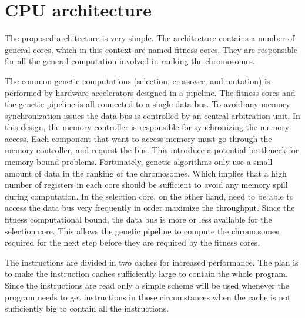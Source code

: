 \section {CPU architecture}




The proposed architecture is very simple.
The architecture contains a number of general cores, which in this context are named fitness cores.
They are responsible for all the general computation involved in ranking the chromosomes.

The common genetic computations (selection, crossover, and mutation) is performed by hardware accelerators designed in a pipeline.
The fitness cores and the genetic pipeline is all connected to a single data bus.
To avoid any memory synchronization issues the data bus is controlled by an central arbitration unit.
In this design, the memory controller is responsible for synchronizing the memory access.
Each component that want to access memory must go through the memory controller, and request the bus.
This introduce a potential bottleneck for memory bound problems.
Fortunately, genetic algorithms only use a small amount of data in the ranking of the chromosomes.
Which implies that a high number of registers in each core should be sufficient to avoid any memory spill during computation.
In the selection core, on the other hand, need to be able to access the data bus very frequently in order maximize the throughput.
Since the fitness computational bound, the data bus is more or less available for the selection core.
This allows the genetic pipeline to compute the chromosomes required for the next step before they are required by the fitness cores. 


The instructions are divided in two caches for increased performance.
The plan is to make the instruction caches sufficiently large to contain the whole program.
Since the instructions are read only a simple scheme will be used whenever the program needs to get instructions in those circumstances when the cache is not sufficiently big to contain all the instructions. 




